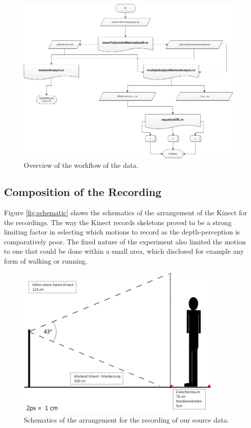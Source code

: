 \documentclass[a4paper]{article}
\begin{document}
\begin{figure}
	\centering
	\includegraphics[width=14cm]{matlabaufbau.png}
	\caption{Overview of the workflow of the data.}
	\label{fig:workflow}
\end{figure}

\subsection{Composition of the Recording}

Figure \ref{fig:schematic} shows the schematics of the arrangement of the Kinect for the recordings.
The way the Kinect records skeletons proved to be a strong limiting factor in selecting which motions to record as the depth-perception is comparatively poor.
The fixed nature of the experiment also limited the motion to one that could be done within a small area, which disclosed for example any form of walking or running.

\begin{figure}
	\centering
	\includegraphics[width=10cm]{Aufbauohnelizenz.png}
	\caption{Schematics of the arrangement for the recording of our source data.}
	\label{fig:Aufbauohnelizenz}
\end{figure}
\end{document}
